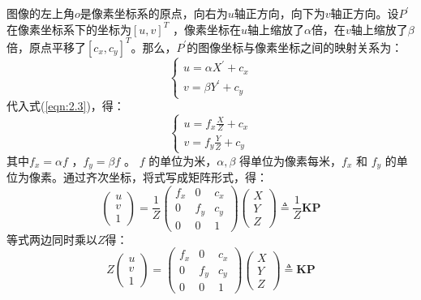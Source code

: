 图像的左上角$o $是像素坐标系的原点，向右为$u $轴正方向，向下为$v $轴正方向。设$P^{\prime} $在像素坐标系下的坐标为$[u, v]^{T} $ ，像素坐标在$u $轴上缩放了$\alpha $倍，在$v $轴上缩放了$\beta $倍，原点平移了$\left[c_{x}, c_{y}\right]^{T} $。那么，$P^{\prime} $的图像坐标与像素坐标之间的映射关系为：
\begin{equation}
\label{eqn:2.4}
\left\{\begin{array}{l}{u=\alpha X^{\prime}+c_{x}} \\ {v=\beta Y^{\prime}+c_{y}}\end{array}\right.
\end{equation}
代入式(\ref{eqn:2.3})，得：
\begin{equation}
\label{eqn:2.5}
\left\{\begin{array}{l}{u=f_{x} \frac{X}{Z}+c_{x}} \\ {v=f_{y} \frac{Y}{Z}+c_{y}}\end{array}\right.
\end{equation}
其中$f_x=\alpha f$ ，$f_y=\beta f  $ 。 $f $ 的单位为米，$\alpha ,\beta $ 得单位为像素每米，$f_x $  和 $f_y $  的单位为像素。通过齐次坐标，将式写成矩阵形式，得：
\begin{equation}
\label{eqn:2.6}
\left( 
\begin{array}{l}{u} \\ {v} \\ {1}\end{array}
\right)=
\frac{1}{Z} \left( 
\begin{array}{ccc}{f_{x}} & {0} & {c_{x}} \\ {0} & {f_{y}} & {c_{y}} \\ {0} & {0} & {1}\end{array}
\right) 
\left( 
\begin{array}{l}{X} \\ {Y} \\ {Z}\end{array}
\right) 
\triangleq \frac{1}{Z} \bm{K} \bm{P}
\end{equation}
等式两边同时乘以$Z $得：
\begin{equation}\label{eqn:2.7}
Z \left( \begin{array}{l}{u} \\ {v} \\ {1}\end{array}\right)=\left( \begin{array}{ccc}{f_{x}} & {0} & {c_{x}} \\ {0} & {f_{y}} & {c_{y}} \\ {0} & {0} & {1}\end{array}\right) \left( \begin{array}{l}{X} \\ {Y} \\ {Z}\end{array}\right) \triangleq \bm{K} \bm{P}
\end{equation}
